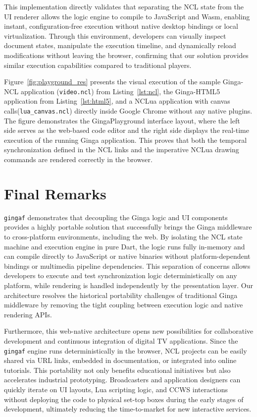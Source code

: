 \documentclass[sigconf]{webmedia}
\newcommand{\projectname}{\texttt{gingaf}}
\begin{document}
This implementation directly validates that separating the NCL state from the UI renderer allows the logic engine to compile to JavaScript and Wasm, enabling instant, configuration-free execution without native desktop bindings or local virtualization. Through this environment, developers can visually inspect document states, manipulate the execution timeline, and dynamically reload modifications without leaving the browser, confirming that our solution provides similar execution capabilities compared to traditional players.

Figure~\ref{fig:playground_res} presents the visual execution of the sample Ginga-NCL application (\texttt{video.ncl}) from Listing~\ref{lst:ncl}, the Ginga-HTML5 application from Listing~\ref{lst:html5}, and a NCLua application with canvas calls(\texttt{lua\_canvas.ncl}) directly inside Google Chrome without any native plugins. The figure demonstrates the GingaPlayground interface layout, where the left side serves as the web-based code editor and the right side displays the real-time execution of the running Ginga application. This proves that both the temporal synchronization defined in the NCL links and the imperative NCLua drawing commands are rendered correctly in the browser.

\section{Final Remarks}
\label{sec:remarks}


\projectname{} demonstrates that decoupling the Ginga logic and UI components provides a highly portable solution that successfully brings the Ginga middleware to cross-platform environments, including the web. By isolating the NCL state machine and execution engine in pure Dart, the logic runs fully in-memory and can compile directly to JavaScript or native binaries without platform-dependent bindings or multimedia pipeline dependencies. This separation of concerns allows developers to execute and test synchronization logic deterministically on any platform, while rendering is handled independently by the presentation layer. Our architecture resolves the historical portability challenges of traditional Ginga middleware by removing the tight coupling between execution logic and native rendering APIs.

Furthermore, this web-native architecture opens new possibilities for collaborative development and continuous integration of digital TV applications. Since the \projectname{} engine runs deterministically in the browser, NCL projects can be easily shared via URL links, embedded in documentation, or integrated into online tutorials. This portability not only benefits educational initiatives but also accelerates industrial prototyping. Broadcasters and application designers can quickly iterate on UI layouts, Lua scripting logic, and CCWS interactions without deploying the code to physical set-top boxes during the early stages of development, ultimately reducing the time-to-market for new interactive services.
\end{document}
